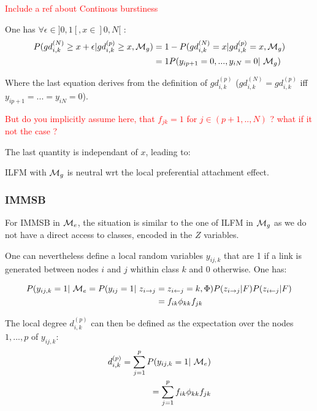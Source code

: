 \begin{definition}
\begin{definition}
\end{definition}

\textcolor{red}{Include a ref about Continous burstiness}

One has $\forall \epsilon \in ]0,1[, x \in ]0,N[$ :
\begin{align*}
P(gd_{i,k}^{(N)} \geq x + \epsilon | gd_{i,k}^{(p)} \geq x, \M_g) &= 1 - P(gd_{i,k}^{(N)} =x | gd_{i,k}^{(p)} = x, \M_g) \\
    &= 1 P(y_{ip+1}=0, ..., y_{iN}=0  | \M_g)
\end{align*}

Where the last equation derives from the definition of $gd_{i,k}^{(p)}$ ($gd_{i,k}^{(N)} = gd_{i,k}^{(p)}$ iff $y_{ip+1}=...=y_{iN}=0$).

\textcolor{red}{But do you implicitly assume here, that $f_{jk}=1$ for $j \in (p+1,.., N)$ ? what if it not the case ?}

The last quantity is independant of $x$, leading to:

\begin{proposition}
ILFM with $\mathcal{M}_g$ is neutral wrt the local preferential attachment effect.

\end{proposition}

\subsubsection{IMMSB}

For IMMSB in $\mathcal{M}_e$, the situation is similar to the one of ILFM in $\mathcal{M}_g$ as we do not have a direct access to classes, encoded in the $Z$ variables.

One can nevertheless define a local random variables $y_{ij,k}$ that are 1 if a link is generated between nodes $i$ and $j$ whithin class $k$ and 0 otherwise. One has:

\begin{align*}
P(y_{ij,k}=1 | \M_e = P(y_{ij}=1 | z_{i\rightarrow j} &= z_{i\leftarrow j}=k, \Phi) P(z_{i\rightarrow j}|F)P(z_{i\leftarrow j}|F) \\
    &= f_{ik} \phi_{kk} f_{jk}
\end{align*}

The local degree $d_{i,k}^{(p)}$ can then be defined as the expectation over the nodes $1,...,p$ of $y_{ij,k}$:
\begin{align*}
d_{i,k}^{(p)} = \sum_{j=1}^p P(y_{ij,k}=1 | \M_e)  \\
    = \sum_{j=1}^p f_{ik} \phi_{kk} f_{jk}
\end{align*}


\end{definition}
